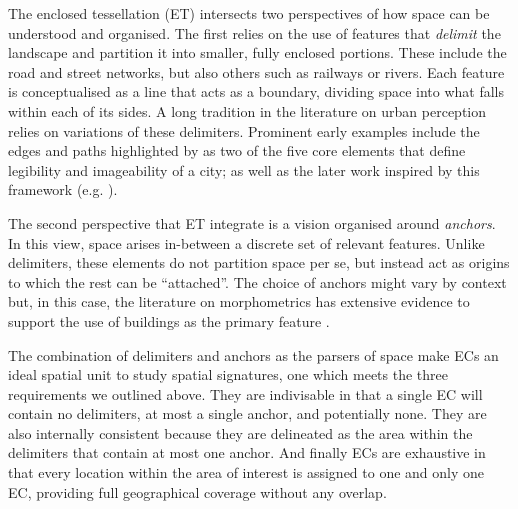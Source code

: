 The enclosed tessellation (ET) intersects two perspectives of how space can be
understood and organised.
%
The first relies on the use of features that \textit{delimit} the landscape and
partition it into smaller, fully enclosed portions. These include the road and
street networks, but also others such as railways or rivers. Each feature is
conceptualised as a line that acts as a boundary, dividing space into what falls
within each of its sides.
%
A long tradition in the literature on urban perception relies on
variations of these delimiters. Prominent
early examples include the edges and paths highlighted by \cite{lynch1960} as
two of the five core elements that define legibility and imageability of a city;
as well as the later work inspired by this framework (e.g. \citealp{filomena2019a}).

The second perspective that ET integrate is a vision organised around
\textit{anchors}. In this view, space arises in-between
a discrete set of relevant features. Unlike delimiters, these elements do not
partition space per se, but instead act as origins to which the rest can be
``attached''.
%
The choice of anchors might vary by context but, in this case, the literature on
morphometrics has extensive evidence to support the use of buildings as the
primary feature \citep{hamaina2012a, usui2013estimation, schirmer2015}.


The combination of delimiters and anchors as the parsers of space make ECs an
ideal spatial unit to study spatial signatures, one which
meets the three requirements we outlined above.
%
They are indivisable in that a single EC will contain no delimiters, at most a
single anchor, and potentially none.
%
They are also internally consistent because they are delineated as the area
within the delimiters that contain at most one anchor.
%
And finally ECs are exhaustive in that every location within the area of
interest is assigned to one and only one EC, providing full geographical
coverage without any overlap.
